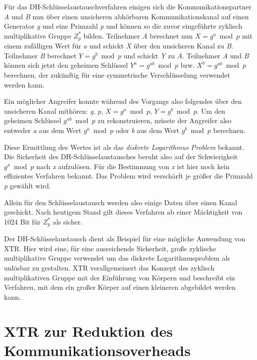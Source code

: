 \documentclass[10pt,        %
               a4paper,     %
               journal,     %
               ]{IEEEtran}
\begin{document}
Für das DH-Schlüsselaustauschverfahren einigen sich die Kommunikationspartner \emph{A} und \emph{B} nun über einen unsicheren abhörbaren Kommunikationskanal auf
einen Generator \emph{g} und eine Primzahl \emph{p} und können so die zuvor eingeführte zyklisch multiplikative Gruppe $Z_{p}^*$ bilden.
Teilnehmer \emph{A} berechnet nun $X = g^a \bmod p$ mit einem zufälligen Wert für \emph{a} und schickt \emph{X} über den unsicheren Kanal zu \emph{B}.
Teilnehmer \emph{B} berechnet $Y = g^b \bmod p$ und schickt \emph{Y} zu \emph{A}. Teilnehmer \emph{A} und \emph{B} können sich jetzt den geheimen Schlüssel $Y^a = g^{ab} \bmod p$ bzw.
$X^b = g^{ab} \bmod p$ berechnen, der zukünftig für eine symmetrische Verschlüsselung verwendet werden kann.

Ein möglicher Angreifer konnte während des Vorgangs also folgendes über den unsicheren Kanal mithören:
 \emph{g}, \emph{p}, \emph{$X = g^a \bmod p$}, \emph{$Y = g^b \bmod p$}. 
Um den geheimen Schlüssel $g^{ab} \bmod p$ zu rekonstruieren, müsste der Angreifer also entweder \emph{a} aus dem Wert $g^a \bmod p$ oder
 \emph{b} aus dem Wert $g^b \bmod p$ berechnen.
 
 Diese Ermittlung des Wertes ist als das \emph{diskrete Logarithmus Problem} bekannt. Die Sicherheit des DH-Schlüsselaustausches beruht also auf der Schwierigkeit
 $g^x \bmod p$ nach \emph{x} aufzulösen. Für die Bestimmung von \emph{x} ist hier noch kein effizientes Verfahren bekannt. Das Problem wird verschärft je größer die Primzahl \emph{p} gewählt wird.
 
 Allein für den Schlüsselaustausch werden also einige Daten über einen Kanal geschickt.
 Nach heutigem Stand gilt dieses Verfahren ab einer Mächtigkeit von 1024 Bit für $Z_p^*$  als sicher.
 
 Der DH-Schlüsselaustausch dient als Beispiel für eine mögliche Anwendung von XTR. Hier wird eine, für eine ausreichende Sicherheit, große zyklische multiplikative Gruppe verwendet um das diskrete Logarithmusproblem als unlösbar zu gestalten. XTR verallgemeinert das Konzept des zyklisch multiplikativen Gruppe mit der Einführung von Körpern und beschreibt ein Verfahren, mit dem ein großer Körper auf einen kleineren abgebildet werden kann.


\section{XTR zur Reduktion des Kommunikationsoverheads}
\label{sec:xtr}
\end{document}
